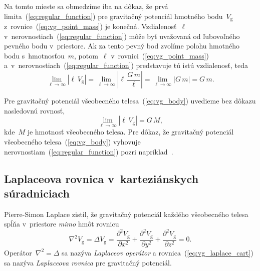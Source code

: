\documentclass[a4paper, 12pt]{book}
\newcommand{\gidx}{\mathrm g}
\begin{document}
Na tomto mieste sa obmedzíme iba na dôkaz, že prvá 
limita~(\ref{eq:regular_function}) pre gravitačný potenciál hmotného 
bodu~$V_\gidx$ z~rovnice~(\ref{eq:vg_point_mass}) je konečná.  
Vzdialenosť~$\ell$ v~nerovnostiach~(\ref{eq:regular_function}) môže byť 
uvažovaná od ľubovoľného pevného bodu v~priestore.  Ak za tento pevný bod 
zvolíme polohu hmotného bodu s~hmotnosťou~$m$, potom~$\ell$ 
v~rovnici~(\ref{eq:vg_point_mass}) 
a~v~nerovnostiach~(\ref{eq:regular_function}) predstavuje tú istú vzdialenosť, 
teda
%
\begin{equation}
\lim_{\ell \rightarrow \infty} \left| \ell \, V_\gidx \right| = \lim_{\ell 
\rightarrow \infty} \left| \ell \, \frac{G \, m}{\ell} \right| = \lim_{\ell 
\rightarrow \infty} \left| G \, m \right| = G \, m{.}
\end{equation}

Pre gravitačný potenciál všeobecného telesa~(\ref{eq:vg_body}) uvedieme bez 
dôkazu nasledovnú rovnosť,
%
\begin{equation}
\label{eq:vg_regular}
\lim_{\ell \rightarrow \infty} \left| \ell \, V_\gidx \right| = G \, M{,}
\end{equation}
%
kde~$M$ je hmotnosť všeobecného telesa.  Pre dôkaz, že gravitačný potenciál 
všeobecného telesa~(\ref{eq:vg_body}) vyhovuje 
nerovnostiam~(\ref{eq:regular_function}) pozri napríklad~\textcite{Pick1973}.





\subsection{Laplaceova rovnica v~karteziánskych súradniciach}
\label{sec:laplace_equation_cart}

Pierre-Simon Laplace zistil, že gravitačný potenciál každého všeobecného telesa
spĺňa v~priestore \emph{mimo} hmôt rovnicu
%
\begin{equation}
\label{eq:vg_laplace_cart}
\nabla^2 V_\gidx = \Delta V_\gidx = \frac{\partial^2 V_\gidx}{\partial x^2}
+ \frac{\partial^2 V_\gidx}{\partial y^2} + \frac{\partial^2 V_\gidx}{\partial
z^2} = 0{.}
\end{equation}
%
Operátor~$\nabla^2 = \Delta$ sa nazýva \emph{Laplaceov operátor} 
a rovnica~(\ref{eq:vg_laplace_cart}) sa nazýva \emph{Laplaceova rovnica} pre
gravitačný potenciál.
\end{document}
